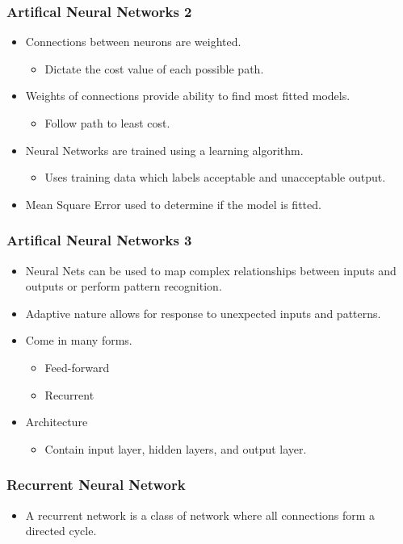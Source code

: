 \documentclass{beamer}
\begin{document}
	\begin{frame}
		\frametitle{Artifical Neural Networks 2}
		\begin{itemize}
			\item Connections between neurons are weighted.
			\begin{itemize}
				\item Dictate the cost value of each possible path.
			\end{itemize}
			\item Weights of connections provide ability to find most fitted models.
			\begin{itemize}
				\item Follow path to least cost.
			\end{itemize}
			\item Neural Networks are trained using a learning algorithm.
			\begin{itemize}
				\item Uses training data which labels acceptable and unacceptable output.
			\end{itemize}
			\item Mean Square Error used to determine if the model is fitted.
		\end{itemize}	
	\end{frame}

	\begin{frame}
		\frametitle{Artifical Neural Networks 3}
		\begin{itemize}
			\item Neural Nets can be used to map complex relationships between inputs and outputs or perform pattern recognition.
			\item Adaptive nature allows for response to unexpected inputs and patterns.
			\item Come in many forms.
			\begin{itemize}
				\item Feed-forward
				\item Recurrent
			\end{itemize}
			\item Architecture
			\begin{itemize}
				\item Contain input layer, hidden layers, and output layer.
			\end{itemize}
		\end{itemize}	
	\end{frame}

	\begin{frame}
		\frametitle{Recurrent Neural Network}
		\begin{itemize}
			\item A recurrent network is a class of network where all connections form a directed cycle.
		\end{itemize}
	\end{frame}
\end{document}
